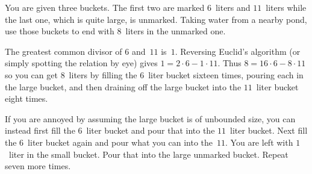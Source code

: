 \documentclass{ibl}  %
\begin{document}
\begin{bezoutproof}
\begin{problem}
You are given three buckets. 
The first two are marked $6$~liters and $11$~liters
while the last one, which is quite large, is unmarked.
Taking water from a nearby pond, use those buckets
to end with $8$~liters in the unmarked one.  
\begin{answer}
The greatest common divisor of $6$ and~$11$ is~$1$.
Reversing Euclid's algorithm (or simply spotting the relation by eye) 
gives $1=2\cdot 6-1\cdot 11$.
Thus $8=16\cdot 6- 8\cdot 11$
so you can get $8$~liters by filling 
the $6$~liter bucket sixteen times, pouring each in the 
large bucket, and then draining off the large bucket into the
$11$~liter bucket eight times.

If you are annoyed by assuming the large bucket is of unbounded size, you
can instead
first fill the $6$~liter bucket and pour that into the $11$~liter bucket.
Next fill the $6$~liter bucket again and pour what you can into the~$11$.
You are left with $1$~liter in the small bucket.  
Pour that into the large unmarked bucket.
Repeat seven more times.    
\end{answer}
\end{problem}


\end{bezoutproof}
\end{document}
